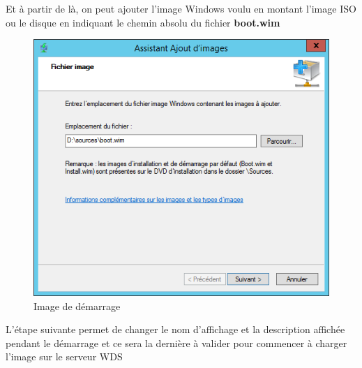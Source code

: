 \documentclass[11pt,a4paper,oneside]{article}
\begin{document}
Et à partir de là, on peut ajouter l'image Windows voulu en montant l'image ISO ou le disque en indiquant le chemin absolu du fichier \textbf{boot.wim} 

\begin{figure}[hbtp]
\centering
\includegraphics[scale=0.7]{Pictures/Configuration/Conf9.png}
\caption{\label{etiquette} Image de démarrage}
\end{figure}
\newpage

L'étape suivante permet de changer le nom d'affichage et la description affichée pendant le démarrage et ce sera la dernière à valider pour commencer à charger l'image sur le serveur WDS
\end{document}
